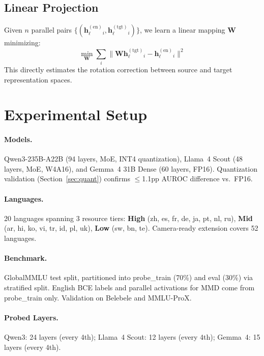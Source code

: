 \documentclass[11pt,a4paper]{article}
\begin{document}
\subsection{Linear Projection}
\label{sec:linproj_method}

Given $n$ parallel pairs $\{(\mathbf{h}_\ell^{(\text{en})}_i, \mathbf{h}_\ell^{(\text{tgt})}_i)\}$, we learn a linear mapping $\mathbf{W}$ minimizing:
\begin{equation}
\min_{\mathbf{W}} \sum_i \|\mathbf{W} \mathbf{h}_\ell^{(\text{tgt})}_i - \mathbf{h}_\ell^{(\text{en})}_i\|^2
\end{equation}
This directly estimates the rotation correction between source and target representation spaces.

\section{Experimental Setup}
\label{sec:setup}

\paragraph{Models.}
Qwen3-235B-A22B (94 layers, MoE, INT4 quantization), Llama~4 Scout (48 layers, MoE, W4A16), and Gemma~4 31B Dense (60 layers, FP16).
Quantization validation (Section~\ref{sec:quant}) confirms $\leq$1.1pp AUROC difference vs.\ FP16.

\paragraph{Languages.}
20 languages spanning 3 resource tiers: \textbf{High} (zh, es, fr, de, ja, pt, nl, ru), \textbf{Mid} (ar, hi, ko, vi, tr, id, pl, uk), \textbf{Low} (sw, bn, te).
Camera-ready extension covers 52 languages.

\paragraph{Benchmark.}
GlobalMMLU test split, partitioned into probe\_train (70\%) and eval (30\%) via stratified split.
English BCE labels and parallel activations for MMD come from probe\_train only.
Validation on Belebele and MMLU-ProX.

\paragraph{Probed Layers.}
Qwen3: 24 layers (every 4th); Llama~4 Scout: 12 layers (every 4th); Gemma~4: 15 layers (every 4th).
\end{document}
